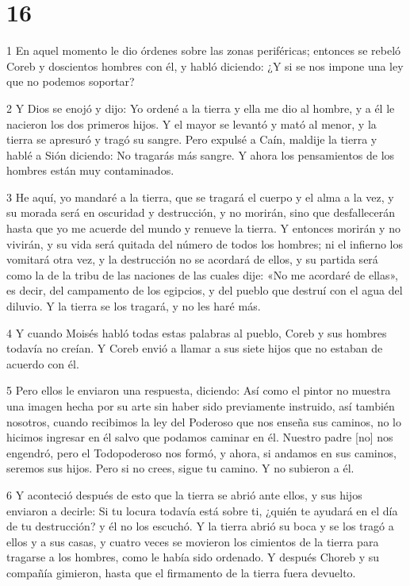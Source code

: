 \chapter{16}

\par 1 En aquel momento le dio órdenes sobre las zonas periféricas; entonces se rebeló Coreb y doscientos hombres con él, y habló diciendo: ¿Y si se nos impone una ley que no podemos soportar?

\par 2 Y Dios se enojó y dijo: Yo ordené a la tierra y ella me dio al hombre, y a él le nacieron los dos primeros hijos. Y el mayor se levantó y mató al menor, y la tierra se apresuró y tragó su sangre. Pero expulsé a Caín, maldije la tierra y hablé a Sión diciendo: No tragarás más sangre. Y ahora los pensamientos de los hombres están muy contaminados.

\par 3 He aquí, yo mandaré a la tierra, que se tragará el cuerpo y el alma a la vez, y su morada será en oscuridad y destrucción, y no morirán, sino que desfallecerán hasta que yo me acuerde del mundo y renueve la tierra. Y entonces morirán y no vivirán, y su vida será quitada del número de todos los hombres; ni el infierno los vomitará otra vez, y la destrucción no se acordará de ellos, y su partida será como la de la tribu de las naciones de las cuales dije: «No me acordaré de ellas», es decir, del campamento de los egipcios, y del pueblo que destruí con el agua del diluvio. Y la tierra se los tragará, y no les haré más.

\par 4 Y cuando Moisés habló todas estas palabras al pueblo, Coreb y sus hombres todavía no creían. Y Coreb envió a llamar a sus siete hijos que no estaban de acuerdo con él.

\par 5 Pero ellos le enviaron una respuesta, diciendo: Así como el pintor no muestra una imagen hecha por su arte sin haber sido previamente instruido, así también nosotros, cuando recibimos la ley del Poderoso que nos enseña sus caminos, no lo hicimos ingresar en él salvo que podamos caminar en él. Nuestro padre [no] nos engendró, pero el Todopoderoso nos formó, y ahora, si andamos en sus caminos, seremos sus hijos. Pero si no crees, sigue tu camino. Y no subieron a él.

\par 6 Y aconteció después de esto que la tierra se abrió ante ellos, y sus hijos enviaron a decirle: Si tu locura todavía está sobre ti, ¿quién te ayudará en el día de tu destrucción? y él no los escuchó. Y la tierra abrió su boca y se los tragó a ellos y a sus casas, y cuatro veces se movieron los cimientos de la tierra para tragarse a los hombres, como le había sido ordenado. Y después Choreb y su compañía gimieron, hasta que el firmamento de la tierra fuera devuelto.


